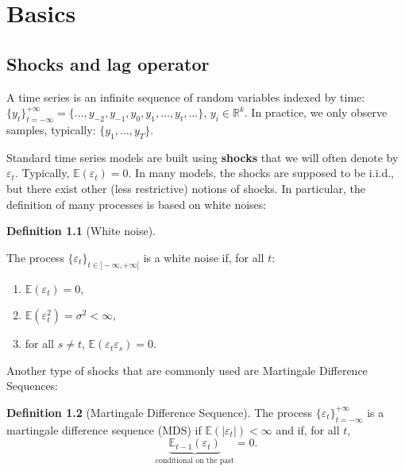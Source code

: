 \documentclass[
  12pt,
]{book}
\providecommand{\tightlist}{%
  \setlength{\itemsep}{0pt}\setlength{\parskip}{0pt}}
\theoremstyle{definition}
\newtheorem{definition}{Definition}[chapter]
\theoremstyle{definition}
\theoremstyle{definition}
\theoremstyle{definition}
\theoremstyle{remark}
\begin{document}
\hypertarget{Intro}{%
\chapter{Basics}\label{Intro}}

\hypertarget{shocks-and-lag-operator}{%
\section{Shocks and lag operator}\label{shocks-and-lag-operator}}

A time series is an infinite sequence of random variables indexed by time: \(\{y_t\}_{t=-\infty}^{+\infty}=\{\dots, y_{-2},y_{-1},y_{0},y_{1},\dots,y_t,\dots\}\), \(y_i \in \mathbb{R}^k\). In practice, we only observe samples, typically: \(\{y_{1},\dots,y_T\}\).

Standard time series models are built using \textbf{shocks} that we will often denote by \(\varepsilon_t\). Typically, \(\mathbb{E}(\varepsilon_t)=0\). In many models, the shocks are supposed to be i.i.d., but there exist other (less restrictive) notions of shocks. In particular, the definition of many processes is based on white noises:

\begin{definition}[White noise]
\protect\hypertarget{def:whitenoise}{}\label{def:whitenoise}

The process \(\{\varepsilon_t\}_{t \in] -\infty,+\infty[}\) is a white noise if, for all \(t\):

\begin{enumerate}
\def\labelenumi{\alph{enumi}.}
\tightlist
\item
  \(\mathbb{E}(\varepsilon_t)=0\),
\item
  \(\mathbb{E}(\varepsilon_t^2)=\sigma^2<\infty\),
\item
  for all \(s\ne t\), \(\mathbb{E}(\varepsilon_t \varepsilon_s)=0\).
\end{enumerate}

\end{definition}

Another type of shocks that are commonly used are Martingale Difference Sequences:

\begin{definition}[Martingale Difference Sequence]
\protect\hypertarget{def:MDS}{}\label{def:MDS}The process \(\{\varepsilon_t\}_{t = -\infty}^{+\infty}\) is a martingale difference sequence (MDS) if \(\mathbb{E}(|\varepsilon_{t}|)<\infty\) and if, for all \(t\),
\[
\underbrace{\mathbb{E}_{t-1}(\varepsilon_{t})}_{\mbox{conditional on the past}}=0.
\]
\end{definition}
\end{document}
